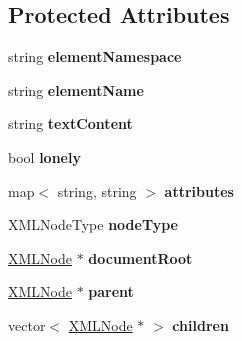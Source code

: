 \subsection*{\-Protected \-Attributes}
\begin{DoxyCompactItemize}
\item 
\hypertarget{class_x_m_l_node_a44fff7004774198f0e61399603ff024d}{string {\bfseries element\-Namespace}}\label{class_x_m_l_node_a44fff7004774198f0e61399603ff024d}

\item 
\hypertarget{class_x_m_l_node_a0b333d6a18592d40159d29e2fbf1a9e3}{string {\bfseries element\-Name}}\label{class_x_m_l_node_a0b333d6a18592d40159d29e2fbf1a9e3}

\item 
\hypertarget{class_x_m_l_node_aa51d05d5856833038c5db309fd026e4a}{string {\bfseries text\-Content}}\label{class_x_m_l_node_aa51d05d5856833038c5db309fd026e4a}

\item 
\hypertarget{class_x_m_l_node_a09b8efdbaaa244137a0abf4c41688868}{bool {\bfseries lonely}}\label{class_x_m_l_node_a09b8efdbaaa244137a0abf4c41688868}

\item 
\hypertarget{class_x_m_l_node_a979f56748474e4083aeb5ddab5eaa085}{map$<$ string, string $>$ {\bfseries attributes}}\label{class_x_m_l_node_a979f56748474e4083aeb5ddab5eaa085}

\item 
\hypertarget{class_x_m_l_node_aa0ad2624424551907d2600c0f1a977c5}{\-X\-M\-L\-Node\-Type {\bfseries node\-Type}}\label{class_x_m_l_node_aa0ad2624424551907d2600c0f1a977c5}

\item 
\hypertarget{class_x_m_l_node_a08e0fea13865ec41e7371054d0ca65b9}{\hyperlink{class_x_m_l_node}{\-X\-M\-L\-Node} $\ast$ {\bfseries document\-Root}}\label{class_x_m_l_node_a08e0fea13865ec41e7371054d0ca65b9}

\item 
\hypertarget{class_x_m_l_node_adf714ef8e4620e7c48f63a8741206bed}{\hyperlink{class_x_m_l_node}{\-X\-M\-L\-Node} $\ast$ {\bfseries parent}}\label{class_x_m_l_node_adf714ef8e4620e7c48f63a8741206bed}

\item 
\hypertarget{class_x_m_l_node_ac3f271eb738d8d756107894db61c8ca6}{vector$<$ \hyperlink{class_x_m_l_node}{\-X\-M\-L\-Node} $\ast$ $>$ {\bfseries children}}\label{class_x_m_l_node_ac3f271eb738d8d756107894db61c8ca6}

\end{DoxyCompactItemize}


